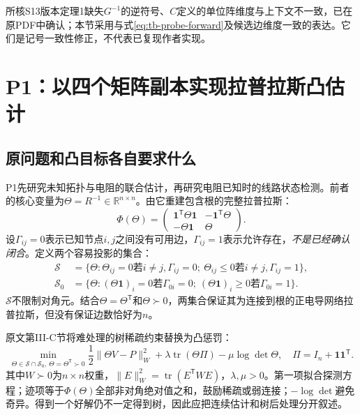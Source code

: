 \documentclass[UTF8,11pt,fontset=fandol,openany,oneside]{ctexbook}
\theoremstyle{definition}
\theoremstyle{remark}
\numberwithin{equation}{chapter}
\begin{document}
所核S13版本定理1缺失$G^{-1}$的逆符号、$C$定义的单位阵维度与上下文不一致，已在原PDF中确认；本节采用与式\eqref{eq:tb-probe-forward}及候选边维度一致的表达。它们是记号一致性修正，不代表已复现作者实现。


\section{P1：以四个矩阵副本实现拉普拉斯凸估计}
\label{sec:tb-P1}

\subsection{原问题和凸目标各自要求什么}

P1\citep{P1}先研究未知拓扑与电阻的联合估计，再研究电阻已知时的线路状态检测。前者的核心变量为$\Theta=R^{-1}\in\mathbb R^{n\times n}$。由它重建包含根的完整拉普拉斯：
\begin{equation}
 \Phi(\Theta)=
 \begin{pmatrix}
 \mathbf1^{\mathsf T}\Theta\mathbf1&-\mathbf1^{\mathsf T}\Theta\\
 -\Theta\mathbf1&\Theta
 \end{pmatrix}.
 \label{eq:tb-P1-full}
\end{equation}
设$\Gamma_{ij}=0$表示已知节点$i,j$之间没有可用边，$\Gamma_{ij}=1$表示允许存在，\emph{不是已经确认闭合}。定义两个容易投影的集合：
\begin{align}
 \mathcal S&=\{\Theta:\Theta_{ij}=0\text{若}i\ne j,\Gamma_{ij}=0;\
                  \Theta_{ij}\leq0\text{若}i\ne j,\Gamma_{ij}=1\},\\
 \mathcal S_0&=\{\Theta:(\Theta\mathbf1)_i=0\text{若}\Gamma_{0i}=0;\
                  (\Theta\mathbf1)_i\geq0\text{若}\Gamma_{0i}=1\}.
\end{align}
$\mathcal S$不限制对角元。结合$\Theta=\Theta^{\mathsf T}$和$\Theta\succ0$，两集合保证其为连接到根的正电导网络拉普拉斯，但没有保证边数恰好为$n$。

原文第III-C节将难处理的树稀疏约束替换为凸惩罚：
\begin{equation}
 \min_{\Theta\in\mathcal S\cap\mathcal S_0,\ \Theta=\Theta^{\mathsf T}\succ0}
 \frac12\|\Theta V-P\|_W^2+
 \lambda\operatorname{tr}(\Theta\Pi)-\mu\log\det\Theta,
 \quad \Pi=I_n+\mathbf1\mathbf1^{\mathsf T}.
 \label{eq:tb-P1-objective}
\end{equation}
其中$W\succ0$为$n\times n$权重，$\|E\|_W^2=\operatorname{tr}(E^{\mathsf T}WE)$，$\lambda,\mu>0$。第一项拟合探测方程；迹项等于$\Phi(\Theta)$全部非对角绝对值之和，鼓励稀疏或弱连接；$-\log\det$避免奇异。得到一个好解仍不一定得到树，因此应把连续估计和树后处理分开叙述。
\end{document}
